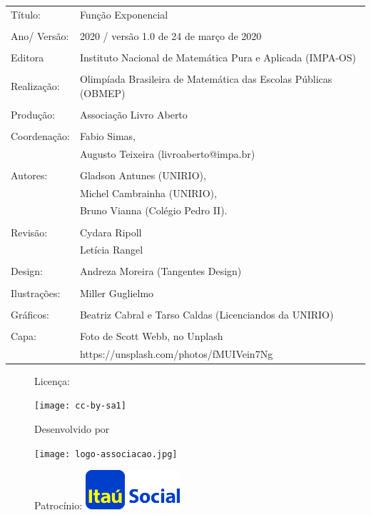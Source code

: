 \begin{tabular}{p{}p{}}
Título: & Função Exponencial\\
\\
Ano/ Versão: & 2020 / versão 1.0 de 24 de março de 2020\\
\\
Editora & Instituto Nacional de Matem\'atica Pura e Aplicada (IMPA-OS)\\
\\
Realização:& Olimp\'iada Brasileira de Matem\'atica das Escolas P\'ublicas (OBMEP)\\
\\
Produção:& Associação Livro Aberto\\
\\
Coordenação:& Fabio Simas, \\
            & Augusto Teixeira (livroaberto@impa.br)\\
\\
  Autores: & Gladson Antunes (UNIRIO),\\
        & Michel Cambrainha (UNIRIO),\\
             & Bruno Vianna (Colégio Pedro II).\\
\\
Revisão: &  Cydara Ripoll  \\
         &  Letícia Rangel \\
\\
Design: & Andreza Moreira (Tangentes Design) \\
\\
  Ilustrações: & Miller  Guglielmo \\ 
\\
Gráficos: & Beatriz Cabral e Tarso Caldas (Licenciandos da UNIRIO)\\
\\
  Capa: & Foto de Scott Webb, no Unplash \\
        & https://unsplash.com/photos/fMUIVein7Ng \\

\end{tabular}



\begin{figure}[b]
\begin{minipage}[l]{5cm}
\centering

{\large Licença:}

  \texttt{[image: cc-by-sa1]}
\end{minipage}\hfill
\begin{minipage}[c]{5cm}
\centering
{\large Desenvolvido por}

\texttt{[image: logo-associacao.jpg]}
\end{minipage}
\begin{minipage}[r]{5cm}
\centering

{\large Patrocínio:}
  \vspace{1em}
  \includegraphics[width=3.5cm]{itau}
\end{minipage}
\end{figure}

